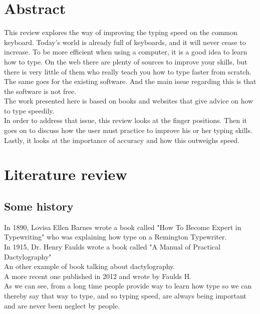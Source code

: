 \chapter{Abstract}
This review explores the way of improving the typing speed on the common keyboard.
Today's world is already full of keyboards, and it will never cease to increase. To be more efficient when using a computer, it is a good idea to learn how to type. On the web there are plenty of sources to improve your skills, but there is very little of them who really teach you how to type faster from scratch. The same goes for the existing software. And the main issue regarding this is that the software is not free.\\
The work presented here is based on books and websites that give advice on how to type speedily.\\
In order to address that issue, this review looks at the finger positions. Then it goes on to discuss how the user must practice to improve his or her typing skills. Lastly, it looks at the importance of accuracy and how this outweighs speed.

\clearpage
\chapter{Literature review}
\section{Some history}
In 1890, Lovisa Ellen Barnes wrote a book called "How To Become Expert in Typewriting"\cite{ref2} who was explaining how type on a Remington Typewriter.\\
In 1915, Dr. Henry Faulds wrote a book called "A Manual of Practical Dactylography"\cite{ref3}\\
An other example of book talking about dactylography.\cite{ref5}\\   
A more recent one published in 2012 and wrote by Faulds H.\cite{ref4}\\
As we can see, from a long time people provide way to learn how type so we can thereby say that way to type, and so typing speed, are always being important and are never been neglect by people.\\

